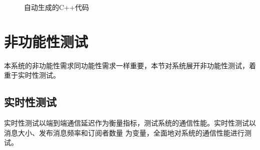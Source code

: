 \begin{figure}[H]
  \centering
  \caption{自动生成的C++代码}
  \label{test_middle_languange}
\end{figure}


\section{非功能性测试}
本系统的非功能性需求同功能性需求一样重要，本节对系统展开非功能性测试，着重于实时性测试。

\subsection{实时性测试}
实时性测试以端到端通信延迟作为衡量指标，测试系统的通信性能。实时性测试以消息大小、发布消息频率和订阅者数量
为变量，全面地对系统的通信性能进行测试。
